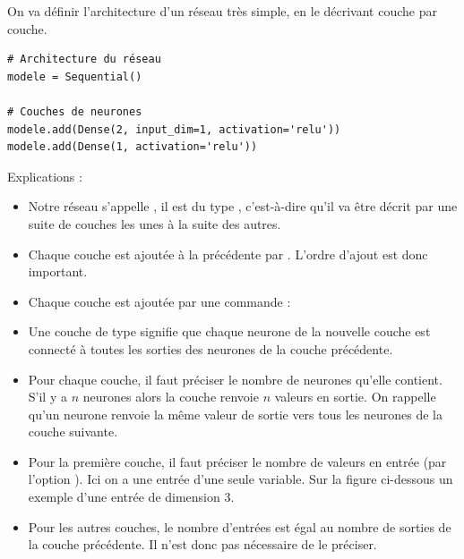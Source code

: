 \documentclass[11pt,class=report,crop=false]{standalone}
\begin{document}
On va définir l'architecture d'un réseau très simple, en le décrivant couche par couche.
\begin{lstlisting}
# Architecture du réseau
modele = Sequential()

# Couches de neurones
modele.add(Dense(2, input_dim=1, activation='relu'))
modele.add(Dense(1, activation='relu'))
\end{lstlisting} 

Explications :
\begin{itemize}
  \item Notre réseau s'appelle , il est du type , c'est-à-dire qu'il va être décrit par une suite de couches les unes à la suite des autres.
  
  \item Chaque couche est ajoutée à la précédente par .
  L'ordre d'ajout est donc important.
  
  \item Chaque couche est ajoutée par une commande :
  
  \item Une couche de type  signifie que chaque neurone de la nouvelle couche est connecté à toutes les sorties des neurones de la couche précédente.
  
 
  
  \item Pour chaque couche, il faut préciser le nombre de neurones qu'elle contient. S'il y a $n$ neurones alors la couche renvoie $n$ valeurs en sortie. On rappelle qu'un neurone renvoie la même valeur de sortie vers tous les neurones de la couche suivante.
  
  \item Pour la première couche, il faut préciser le nombre de valeurs en entrée (par l'option ). Ici on a une entrée d'une seule variable. Sur la figure ci-dessous un exemple d'une entrée de dimension $3$.


  \item Pour les autres couches, le nombre d'entrées est égal au nombre de sorties de la couche précédente. Il n'est donc pas nécessaire de le préciser.
  

\end{itemize}
\end{document}
